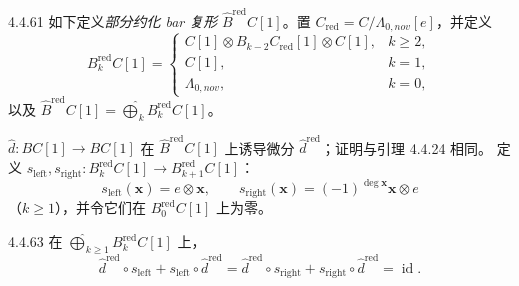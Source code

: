 \begin{definition}{4.4.61}\label{def:4-4-61}
如下定义\emph{部分约化 bar 复形}
$\widehat B^{\mathrm{red}}C[1]$。置
$C_{\mathrm{red}}=C/\Lambda_{0,nov}[e]$，并定义
\begin{equation}
 B_k^{\mathrm{red}}C[1]
 =\begin{cases}
 C[1]\otimes B_{k-2}C_{\mathrm{red}}[1]\otimes C[1],&k\geq2,\\
 C[1],&k=1,\\
 \Lambda_{0,nov},&k=0,
 \end{cases}
\tag{4.4.62}\label{eq:4-4-62}
\end{equation}
以及
$\widehat B^{\mathrm{red}}C[1]
=\widehat{\bigoplus}_kB_k^{\mathrm{red}}C[1]$。
\end{definition}

$\widehat d\colon BC[1]\to BC[1]$ 在
$\widehat B^{\mathrm{red}}C[1]$ 上诱导微分
$\widehat d^{\mathrm{red}}$；证明与引理 4.4.24 相同。
定义
$s_{\mathrm{left}},s_{\mathrm{right}}\colon
B_k^{\mathrm{red}}C[1]\to B_{k+1}^{\mathrm{red}}C[1]$：
\[
 s_{\mathrm{left}}(\mathbf x)=e\otimes\mathbf x,
 \qquad
 s_{\mathrm{right}}(\mathbf x)
 =(-1)^{\deg\mathbf x}\mathbf x\otimes e
\]
（$k\geq1$），并令它们在 $B_0^{\mathrm{red}}C[1]$ 上为零。

\begin{lemma}{4.4.63}\label{lem:4-4-63}
在 $\widehat{\bigoplus}_{k\geq1}B_k^{\mathrm{red}}C[1]$ 上，
\[
 \widehat d^{\mathrm{red}}\circ s_{\mathrm{left}}
 +s_{\mathrm{left}}\circ\widehat d^{\mathrm{red}}
 =\widehat d^{\mathrm{red}}\circ s_{\mathrm{right}}
 +s_{\mathrm{right}}\circ\widehat d^{\mathrm{red}}
 =\operatorname{id}.
\]
\end{lemma}

